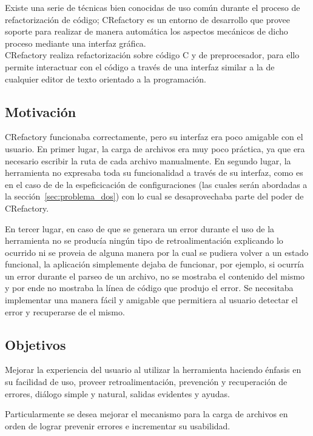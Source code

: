 \documentclass[a4paper,oneside,12pt]{article}
\begin{document}
Existe una serie de t\'ecnicas bien conocidas de uso com\'un durante el proceso de refactorizaci\'on de c\'odigo; CRefactory es un entorno de desarrollo que provee soporte para realizar de manera autom\'atica los aspectos mec\'anicos de dicho proceso mediante una interfaz gr\'afica.\\
CRefactory realiza refactorizaci\'on sobre c\'odigo C y de preprocesador, para ello permite interactuar con el c\'odigo a trav\'es de una interfaz similar a la de cualquier editor de texto orientado a la programaci\'on.

\subsection{Motivaci\'on}

CRefactory funcionaba correctamente, pero su interfaz era poco amigable con el usuario. En primer lugar, la carga de archivos era muy poco pr\'actica, ya que era necesario escribir la ruta de cada archivo manualmente.
En segundo lugar, la herramienta no expresaba toda su funcionalidad a trav\'es de su interfaz, como es en el caso de de la espeficicaci\'on de configuraciones (las cuales ser\'an abordadas a la secci\'on~\ref{sec:problema_dos}) con lo cual se desaprovechaba  parte del poder de CRefactory.

En tercer lugar, en caso de que se generara un error durante el uso de la herramienta no se produc\'ia ning\'un tipo de retroalimentaci\'on explicando lo ocurrido ni se proveia de alguna manera por la cual se pudiera volver a un estado funcional, la aplicaci\'on simplemente dejaba de funcionar, por ejemplo, si ocurr\'ia un error durante el parseo de un archivo, no se mostraba el contenido del mismo y por ende no mostraba la l\'inea de c\'odigo que produjo el error. Se necesitaba implementar una manera f\'acil y amigable que permitiera al usuario detectar el error y recuperarse de el mismo.


\subsection{Objetivos}

Mejorar la experiencia del usuario al utilizar la herramienta haciendo \'enfasis en su facilidad de uso, proveer retroalimentaci\'on, prevenci\'on y recuperaci\'on de errores, di\'alogo simple y natural, salidas evidentes y ayudas.

Particularmente se desea mejorar el mecanismo para la carga de archivos en orden de lograr prevenir errores e incrementar su usabilidad.
\end{document}
